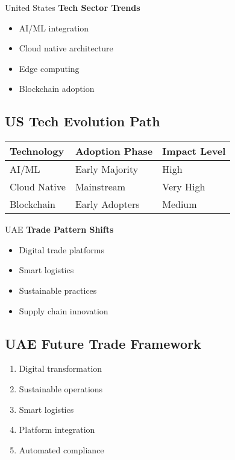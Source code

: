 \begin{regionalbox}{United States}
\textbf{Tech Sector Trends}
\begin{itemize}
    \item AI/ML integration
    \item Cloud native architecture
    \item Edge computing
    \item Blockchain adoption
\end{itemize}
\end{regionalbox}

\subsection{US Tech Evolution Path}
\begin{center}
\begin{tabularx}{\textwidth}{>{\raggedright\arraybackslash}X >{\centering\arraybackslash}X >{\centering\arraybackslash}X}
    \toprule
    \textbf{Technology} & \textbf{Adoption Phase} & \textbf{Impact Level} \\
    \midrule
    AI/ML & Early Majority & High \\
    Cloud Native & Mainstream & Very High \\
    Blockchain & Early Adopters & Medium \\
    \bottomrule
\end{tabularx}
\end{center}

\begin{regionalbox}{UAE}
\textbf{Trade Pattern Shifts}
\begin{itemize}
    \item Digital trade platforms
    \item Smart logistics
    \item Sustainable practices
    \item Supply chain innovation
\end{itemize}

\subsection{UAE Future Trade Framework}
\begin{tcolorbox}[colback=white,colframe=primary,title=\textbf{Future Trade Components}]
\begin{enumerate}
    \item Digital transformation
    \item Sustainable operations
    \item Smart logistics
    \item Platform integration
    \item Automated compliance
\end{enumerate}
\end{tcolorbox}
\end{regionalbox}

